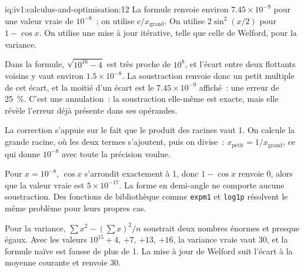 \begin{solution}{iq:iv1:calculus-and-optimisation:12}
La formule renvoie environ $7.45 \times 10^{-9}$ pour une valeur vraie de $10^{-8}$~; on utilise $c/x_{\text{grand}}$. On utilise $2\sin^2(x/2)$ pour $1 - \cos x$. On utilise une mise à jour itérative, telle que celle de Welford, pour la variance.

Dans la formule, $\sqrt{10^{16} - 4}$ est très proche de $10^8$, et l'écart entre deux flottants voisins y vaut environ $1.5 \times 10^{-8}$. La soustraction renvoie donc un petit multiple de cet écart, et la moitié d'un écart est le $7.45 \times 10^{-9}$ affiché~: une erreur de 25~\%. C'est une annulation~: la soustraction elle-même est exacte, mais elle révèle l'erreur déjà présente dans ses opérandes.

La correction s'appuie sur le fait que le produit des racines vaut 1. On calcule la grande racine, où les deux termes s'ajoutent, puis on divise~: $x_{\text{petit}} = 1/x_{\text{grand}}$, ce qui donne $10^{-8}$ avec toute la précision voulue.

Pour $x = 10^{-8}$, $\cos x$ s'arrondit exactement à 1, donc $1 - \cos x$ renvoie 0, alors que la valeur vraie est $5 \times 10^{-17}$. La forme en demi-angle ne comporte aucune soustraction. Des fonctions de bibliothèque comme \texttt{expm1} et \texttt{log1p} résolvent le même problème pour leurs propres cas.

Pour la variance, $\sum x^2 - (\sum x)^2/n$ soustrait deux nombres énormes et presque égaux. Avec les valeurs $10^{15} + 4$, $+7$, $+13$, $+16$, la variance vraie vaut 30, et la formule naïve est fausse de plus de 1. La mise à jour de Welford suit l'écart à la moyenne courante et renvoie 30.



\end{solution}

